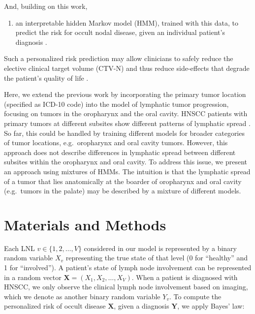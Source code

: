 \documentclass[11pt,twocolumn,twoside]{article}
\providecommand{\tightlist}{%
  \setlength{\itemsep}{0pt}\setlength{\parskip}{0pt}}\usepackage{longtable,booktabs,array}
\begin{document}
And, building on this work,

\begin{enumerate}
\def\labelenumi{\arabic{enumi}.}
\setcounter{enumi}{1}
\tightlist
\item
  an interpretable hidden Markov model (HMM), trained with this data, to
  predict the risk for occult nodal disease, given an individual
  patient's diagnosis \autocite{ludwig_hidden_2021}.
\end{enumerate}

Such a personalized risk prediction may allow clinicians to safely
reduce the elective clinical target volume (CTV-N) and thus reduce
side-effects that degrade the patient's quality of life
\autocite{batth_practical_2014}.

Here, we extend the previous work by incorporating the primary tumor
location (specified as ICD-10 code) into the model of lymphatic tumor
progression, focusing on tumors in the oropharynx and the oral cavity.
HNSCC patients with primary tumors at different subsites show different
patterns of lymphatic spread
\autocite{lindberg_distribution_1972,woolgar_histological_1999}. So far,
this could be handled by training different models for broader
categories of tumor locations, e.g.~oropharynx and oral cavity tumors.
However, this approach does not describe differences in lymphatic spread
between different subsites within the oropharynx and oral cavity. To
address this issue, we present an approach using mixtures of HMMs. The
intuition is that the lymphatic spread of a tumor that lies anatomically
at the boarder of oropharynx and oral cavity (e.g.~tumors in the palate)
may be described by a mixture of different models.

\section{Materials and Methods}\label{sec-materials-and-methods}

Each LNL \(v \in \{ 1, 2, \ldots, V\}\) considered in our model is
represented by a binary random variable \(X_v\) representing the true
state of that level (0 for ``healthy'' and 1 for ``involved''). A
patient's state of lymph node involvement can be represented in a random
vector \(\mathbf{X} = \left( X_1, X_2, \ldots, X_V \right)\). When a
patient is diagnosed with HNSCC, we only observe the clinical lymph node
involvement based on imaging, which we denote as another binary random
variable \(Y_v\). To compute the personalized risk of occult disease
\(\mathbf{X}\), given a diagnosis \(\mathbf{Y}\), we apply Bayes' law:
\end{document}
